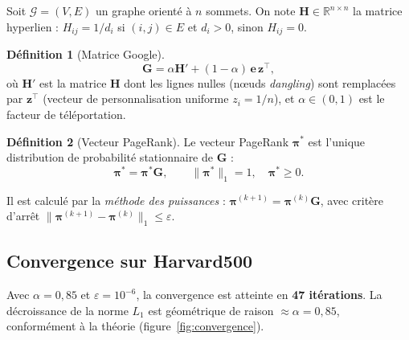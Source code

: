 \documentclass[12pt,a4paper]{article}
\newcommand{\vpi}{\boldsymbol{\pi}}
\newcommand{\G}{\mathbf{G}}
\newcommand{\Hmat}{\mathbf{H}}
\theoremstyle{definition}
\newtheorem{definition}{D\'{e}finition}
\begin{document}
Soit $\mathcal{G} = (V,E)$ un graphe orient\'{e} \`{a} $n$ sommets.
On note $\Hmat \in \mathbb{R}^{n \times n}$ la matrice hyperlien :
$H_{ij} = 1/d_i$ si $(i,j) \in E$ et $d_i > 0$, sinon $H_{ij} = 0$.

\begin{definition}[Matrice Google]
\[
  \G = \alpha \Hmat' + (1-\alpha)\,\mathbf{e}\,\mathbf{z}^{\top},
\]
o\`{u} $\Hmat'$ est la matrice $\Hmat$ dont les lignes nulles (n\oe{}uds
\emph{dangling}) sont remplac\'{e}es par $\mathbf{z}^{\top}$ (vecteur de
personnalisation uniforme $z_i = 1/n$), et $\alpha \in (0,1)$ est le
facteur de t\'{e}l\'{e}portation.
\end{definition}

\begin{definition}[Vecteur PageRank]
Le vecteur PageRank $\vpi^*$ est l'unique distribution de probabilit\'{e}
stationnaire de $\G$ :
\[
  \vpi^* = \vpi^*\G, \qquad \|\vpi^*\|_1 = 1,\quad \vpi^* \geq 0.
\]
\end{definition}

Il est calcul\'{e} par la \emph{m\'{e}thode des puissances} :
$\vpi^{(k+1)} = \vpi^{(k)}\G$, avec crit\`{e}re d'arr\^{e}t
$\|\vpi^{(k+1)} - \vpi^{(k)}\|_1 \leq \varepsilon$.

\subsection{Convergence sur Harvard500}

Avec $\alpha = 0{,}85$ et $\varepsilon = 10^{-6}$, la convergence est
atteinte en \textbf{47 it\'{e}rations}. La d\'{e}croissance de la norme $L_1$
est g\'{e}om\'{e}trique de raison $\approx \alpha = 0{,}85$, conform\'{e}ment
\`{a} la th\'{e}orie (figure~\ref{fig:convergence}).
\end{document}
